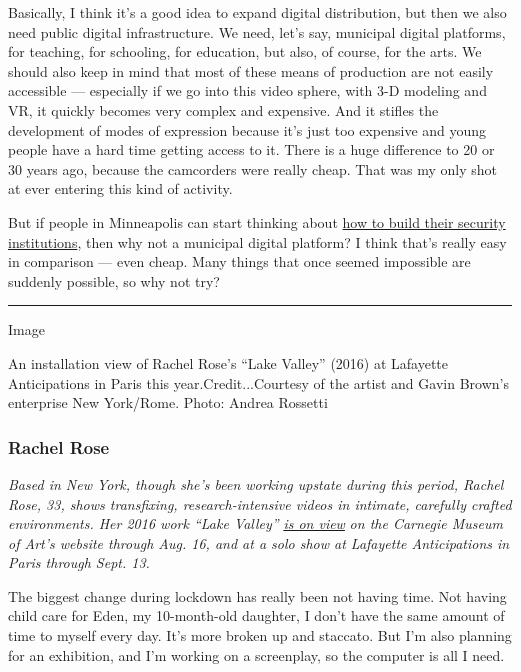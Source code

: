 Basically, I think it's a good idea to expand digital distribution, but
then we also need public digital infrastructure. We need, let's say,
municipal digital platforms, for teaching, for schooling, for education,
but also, of course, for the arts. We should also keep in mind that most
of these means of production are not easily accessible --- especially if
we go into this video sphere, with 3-D modeling and VR, it quickly
becomes very complex and expensive. And it stifles the development of
modes of expression because it's just too expensive and young people
have a hard time getting access to it. There is a huge difference to 20
or 30 years ago, because the camcorders were really cheap. That was my
only shot at ever entering this kind of activity.

But if people in Minneapolis can start thinking about
\href{https://www.nytimes.com/2020/06/07/us/minneapolis-police-abolish.html}{how
to build their security institutions}, then why not a municipal digital
platform? I think that's really easy in comparison --- even cheap. Many
things that once seemed impossible are suddenly possible, so why not
try?

\begin{center}\rule{0.5\linewidth}{\linethickness}\end{center}

Image

An installation view of Rachel Rose's ``Lake Valley'' (2016) at
Lafayette Anticipations in Paris this year.Credit...Courtesy of the
artist and Gavin Brown's enterprise New York/Rome. Photo: Andrea
Rossetti

\hypertarget{rachel-rose}{%
\subsubsection{\texorpdfstring{\textbf{Rachel
Rose}}{Rachel Rose}}\label{rachel-rose}}

\emph{Based in New York, though she's been working upstate during this
period, Rachel Rose, 33, shows transfixing, research-intensive videos in
intimate, carefully crafted environments. Her 2016 work ``Lake Valley''}
\href{https://cmoa.org/exhibition/rachel-rose/}{\emph{is on view}}
\emph{on the Carnegie Museum of Art's website through Aug. 16, and at a
solo show at Lafayette Anticipations in Paris through Sept. 13.}

The biggest change during lockdown has really been not having time. Not
having child care for Eden, my 10-month-old daughter, I don't have the
same amount of time to myself every day. It's more broken up and
staccato. But I'm also planning for an exhibition, and I'm working on a
screenplay, so the computer is all I need.

